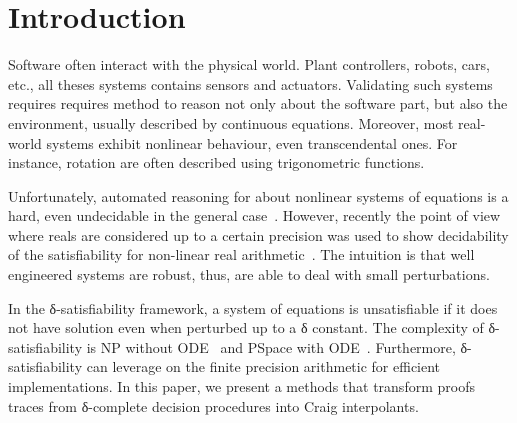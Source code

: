 \section{Introduction}
\label{sec:intro}

Software often interact with the physical world.
Plant controllers, robots, cars, etc., all theses systems contains sensors and actuators.
Validating such systems requires requires method to reason not only about the software part, but also the environment, usually described by continuous equations.
Moreover, most real-world systems exhibit nonlinear behaviour, even transcendental ones.
For instance, rotation are often described using trigonometric functions.

Unfortunately, automated reasoning for about nonlinear systems of equations is a hard, even undecidable in the general case~\cite{DBLP:conf/lics/GaoAC12}.
However, recently the point of view~\cite{realQuasiDec,hybridQuasiDec} where reals are considered up to a certain precision was used to show decidability of the satisfiability for non-linear real arithmetic~\cite{DBLP:conf/lics/GaoAC12,DBLP:conf/fmcad/GaoKC13}.
The intuition is that well engineered systems are robust, thus, are able to deal with small perturbations.

In the δ-satisfiability framework, a system of equations is unsatisfiable if it does not have solution even when perturbed up to a δ constant.
The complexity of δ-satisfiability is NP without ODE~\cite{DBLP:conf/lics/GaoAC12} and PSpace with ODE~\cite{DBLP:conf/fmcad/GaoKC13}.
Furthermore, δ-satisfiability can leverage on the finite precision arithmetic for efficient implementations.
In this paper, we present a methods that transform proofs traces from δ-complete decision procedures into Craig interpolants.


